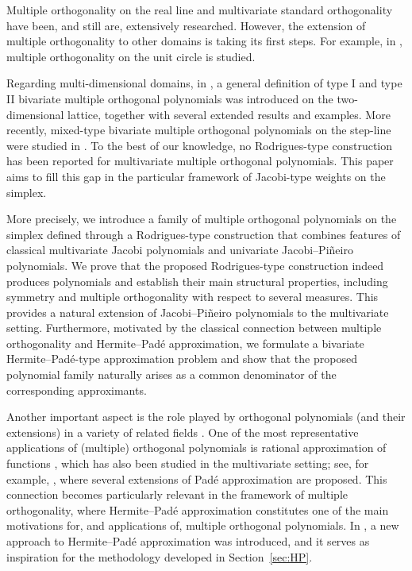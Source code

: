 \documentclass[11pt,reqno]{amsart}
\theoremstyle{definition}
\begin{document}
Multiple orthogonality on the real line and multivariate standard orthogonality have been, and still are, extensively researched. However, the extension of multiple orthogonality to other domains is taking its first steps. For example, in \citep{CDO15, KV24, KV26}, multiple orthogonality on the unit circle is studied. 

Regarding multi-dimensional domains, in \citep{FV26}, a general definition of type I and type II bivariate multiple orthogonal polynomials was introduced on the two-dimensional lattice, together with several extended results and examples. More recently, mixed-type bivariate multiple orthogonal polynomials on the step-line were studied in  \citep{MRW25}. To the best of our knowledge, no Rodrigues-type construction has been reported for multivariate multiple orthogonal polynomials. This paper aims to fill this gap in the particular framework of Jacobi-type weights on the simplex.

More precisely, we introduce a family of multiple orthogonal polynomials on the simplex defined through a Rodrigues-type construction that combines features of classical multivariate Jacobi polynomials and univariate Jacobi--Piñeiro polynomials. We prove that the proposed Rodrigues-type construction indeed produces polynomials and establish their main structural properties, including symmetry and multiple orthogonality with respect to several measures. This provides a natural extension of Jacobi--Piñeiro polynomials to the multivariate setting. Furthermore, motivated by the classical connection between multiple orthogonality and Hermite--Padé approximation, we formulate a bivariate Hermite--Padé-type approximation problem and show that the proposed polynomial family naturally arises as a common denominator of the corresponding approximants.


Another important aspect is the role played by orthogonal polynomials (and their extensions) in a variety of related fields \citep{MFVA16}. One of the most representative applications of (multiple) orthogonal polynomials is rational approximation of functions \citep{VA06}, which has also been studied in the multivariate setting; see, for example, \citep{CB00,Cuy83,Cuy86,Cuy99,CLY16}, where several extensions of Padé approximation are proposed. This connection becomes particularly relevant in the framework of multiple orthogonality, where Hermite--Padé approximation constitutes one of the main motivations for, and applications of, multiple orthogonal polynomials. In \citep{Sor02}, a new approach to Hermite--Padé approximation was introduced, and it serves as inspiration for the methodology developed in Section~\ref{sec:HP}.
\end{document}

